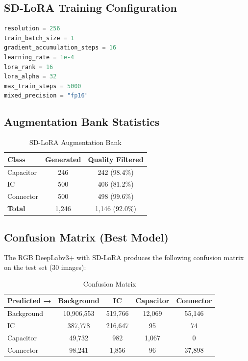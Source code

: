\documentclass[12pt,a4paper]{article}
\begin{document}
\subsection{SD-LoRA Training Configuration}

\begin{lstlisting}[language=Python, caption=LoRA Hyperparameters]
resolution = 256
train_batch_size = 1
gradient_accumulation_steps = 16
learning_rate = 1e-4
lora_rank = 16
lora_alpha = 32
max_train_steps = 5000
mixed_precision = "fp16"
\end{lstlisting}

\subsection{Augmentation Bank Statistics}

\begin{table}[H]
\centering
\caption{SD-LoRA Augmentation Bank}
\begin{tabular}{lcc}
\toprule
\textbf{Class} & \textbf{Generated} & \textbf{Quality Filtered} \\
\midrule
Capacitor & 246 & 242 (98.4\%) \\
IC & 500 & 406 (81.2\%) \\
Connector & 500 & 498 (99.6\%) \\
\textbf{Total} & 1,246 & 1,146 (92.0\%) \\
\bottomrule
\end{tabular}
\end{table}

\subsection{Confusion Matrix (Best Model)}

The RGB DeepLabv3+ with SD-LoRA produces the following confusion matrix on the test set (30 images):

\begin{table}[H]
\centering
\caption{Confusion Matrix}
\begin{tabular}{l|cccc}
\toprule
\textbf{Predicted →} & Background & IC & Capacitor & Connector \\
\midrule
Background & 10,906,553 & 519,766 & 12,069 & 55,146 \\
IC & 387,778 & 216,647 & 95 & 74 \\
Capacitor & 49,732 & 982 & 1,067 & 0 \\
Connector & 98,241 & 1,856 & 96 & 37,898 \\
\bottomrule
\end{tabular}
\end{table}
\end{document}
